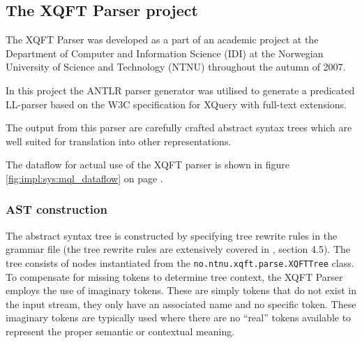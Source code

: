 \subsection{The XQFT Parser project}
\label{sect:theory:xqftparser}
The XQFT Parser\cite{ourselves} was developed as a part of an academic project
at the Department of Computer and Information Science (IDI) at the Norwegian
University of Science and Technology (NTNU) throughout the autumn of 2007.

In this project the ANTLR parser generator was utilised to generate a
predicated LL-parser based on the W3C specification\cite{w3c01} for XQuery with
full-text extensions.

The output from this parser are carefully crafted abstract syntax trees which
are well suited for translation into other representations.

% 

The dataflow for actual use of the XQFT parser is shown in figure
\ref{fig:impl:sys:mql_dataflow} on page \pageref{fig:impl:sys:mql_dataflow}.

\subsubsection{AST construction}
\label{sect:theory:xqftparser:ast_construction}
The abstract syntax tree is constructed by specifying tree rewrite rules in the
grammar file (the tree rewrite rules are extensively covered in
\cite{ourselves}, section 4.5). The tree consists of nodes instantiated from the
\verb!no.ntnu.xqft.parse.XQFTTree! class. To compensate for missing tokens to
determine tree context, the XQFT Parser employs the use of imaginary tokens.
These are simply tokens that do not exist in the input stream, they only have
an associated name and no specific token. These imaginary tokens are typically
used where there are no ``real'' tokens available to represent the proper
semantic or contextual meaning.


